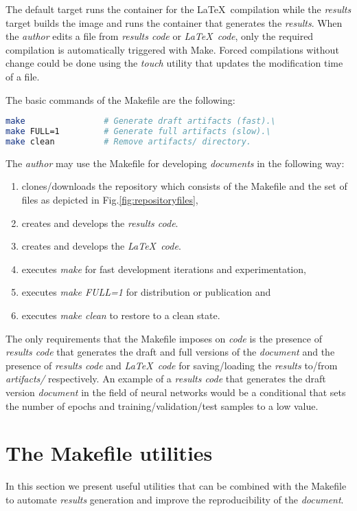\documentclass[journal]{IEEEtran}
\begin{document}
The default target runs the container for the \LaTeX\ compilation while the \textit{results} target builds the image and runs the container that generates the \textit{results}.
When the \textit{author} edits a file from \textit{results code} or \textit{\LaTeX\ code}, only the required compilation is automatically triggered with Make.
Forced compilations without change could be done using the \textit{touch} utility that updates the modification time of a file.

The basic commands of the Makefile are the following:
\begin{lstlisting}[language=bash, style=lststyle, caption={Basic Makefile commands.}]
make                # Generate draft artifacts (fast).\ 
make FULL=1         # Generate full artifacts (slow).\ 
make clean          # Remove artifacts/ directory.
\end{lstlisting}

The \textit{author} may use the Makefile for developing \textit{documents} in the following way:
\begin{enumerate}
	\item clones/downloads the repository which consists of the Makefile and the set of files as depicted in Fig.\ref{fig:repositoryfiles},
	\item creates and develops the \textit{results code}.
	\item creates and develops the \textit{\LaTeX\ code}.
	\item executes \textit{make} for fast development iterations and experimentation,
	\item executes \textit{make FULL=1} for distribution or publication and
	\item executes \textit{make clean} to restore to a clean state.
\end{enumerate}

The only requirements that the Makefile imposes on \textit{code} is the presence of \textit{results code} that generates the draft and full versions of the \textit{document} and the presence of \textit{results code} and \textit{\LaTeX\ code} for saving/loading the \textit{results} to/from \textit{artifacts/} respectively.
An example of a \textit{results code} that generates the draft version \textit{document} in the field of neural networks would be a conditional that sets the number of epochs and training/validation/test samples to a low value.

\section{The Makefile utilities}
In this section we present useful utilities that can be combined with the Makefile to automate \textit{results} generation and improve the reproducibility of the \textit{document}.
\end{document}
